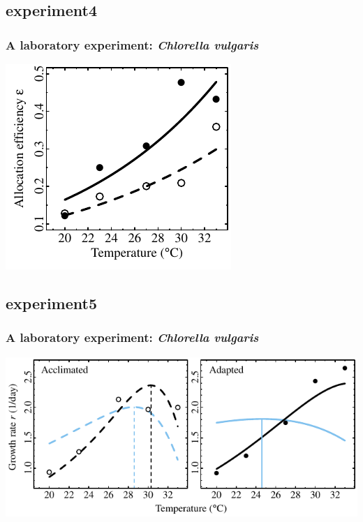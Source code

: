 \documentclass{beamer}
\begin{document}
\subsection{experiment4}
\begin{frame}
  \frametitle{A laboratory experiment: \textit{Chlorella vulgaris}}

  \begin{center}
    \includegraphics{figs/dan_res_eps_pres.pdf}
  \end{center}

\end{frame}



\subsection{experiment5}
\begin{frame}
  \frametitle{A laboratory experiment: \textit{Chlorella vulgaris}}

  \begin{center}
    \includegraphics{figs/dan_res2_pres.pdf}
  \end{center}

\end{frame}
\end{document}
